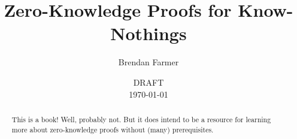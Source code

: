 \documentclass[12pt]{article}
\title{Zero-Knowledge Proofs for Know-Nothings}
\author{
  Brendan Farmer
}
\date{DRAFT\\\today}
\begin{document}
\maketitle

\begin{abstract}
This is a book! Well, probably not. But it does intend to be a resource for learning more about zero-knowledge proofs without (many) prerequisites.

\end{abstract}

\newpage
{\hypersetup{hidelinks} \tableofcontents}
\newpage

{}

\end{document}
